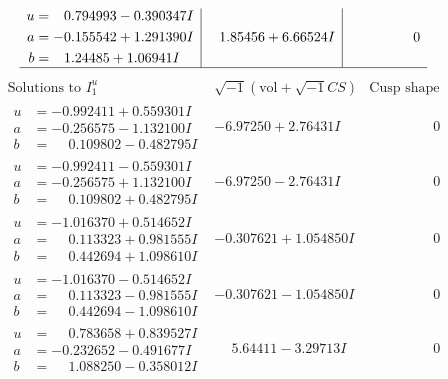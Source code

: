 \documentclass[1p]{elsarticle_modified}
\theoremstyle{definition}
\newcommand{\I}{\sqrt{-1}}
\begin{document}
$$\begin{array}{c|c|c}
\begin{aligned}
u &= \phantom{-}0.794993 - 0.390347 I \\
a &= -0.155542 + 1.291390 I \\
b &= \phantom{-}1.24485 + 1.06941 I\end{aligned}
 & \phantom{-}1.85456 + 6.66524 I & \phantom{-0.000000 } 0\\
 \hline 
 \end{array}$$\newpage$$\begin{array}{c|c|c}  
\text{Solutions to }I^u_{1}& \I (\text{vol} + \sqrt{-1}CS) & \text{Cusp shape}\\
 \hline 
\begin{aligned}
u &= -0.992411 + 0.559301 I \\
a &= -0.256575 - 1.132100 I \\
b &= \phantom{-}0.109802 - 0.482795 I\end{aligned}
 & -6.97250 + 2.76431 I & \phantom{-0.000000 } 0 \\ \hline\begin{aligned}
u &= -0.992411 - 0.559301 I \\
a &= -0.256575 + 1.132100 I \\
b &= \phantom{-}0.109802 + 0.482795 I\end{aligned}
 & -6.97250 - 2.76431 I & \phantom{-0.000000 } 0 \\ \hline\begin{aligned}
u &= -1.016370 + 0.514652 I \\
a &= \phantom{-}0.113323 + 0.981555 I \\
b &= \phantom{-}0.442694 + 1.098610 I\end{aligned}
 & -0.307621 + 1.054850 I & \phantom{-0.000000 } 0 \\ \hline\begin{aligned}
u &= -1.016370 - 0.514652 I \\
a &= \phantom{-}0.113323 - 0.981555 I \\
b &= \phantom{-}0.442694 - 1.098610 I\end{aligned}
 & -0.307621 - 1.054850 I & \phantom{-0.000000 } 0 \\ \hline\begin{aligned}
u &= \phantom{-}0.783658 + 0.839527 I \\
a &= -0.232652 - 0.491677 I \\
b &= \phantom{-}1.088250 - 0.358012 I\end{aligned}
 & \phantom{-}5.64411 - 3.29713 I & \phantom{-0.000000 } 0 \\ \hline\begin{aligned}

\end{aligned}
\end{array}$$
\end{document}
